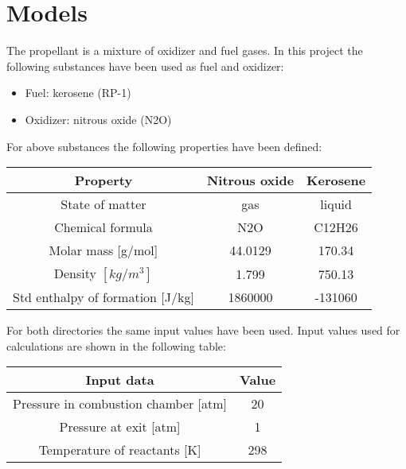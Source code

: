 \documentclass[11pt]{article}
\begin{document}
\section{Models}
The propellant is a mixture of oxidizer and fuel gases. In this project the following substances have been used as fuel and oxidizer:\\
\begin{itemize}
\item Fuel: kerosene (RP-1)
\item Oxidizer: nitrous oxide (N2O)
\end{itemize}
For above substances the following properties have been defined:\\
\begin{center}
\begin{tabular}{|c|c|c|}
\hline 
Property & Nitrous oxide & Kerosene \\ 
\hline
State of matter & gas & liquid\\
\hline 
Chemical formula & N2O & C12H26 \\ 
\hline 
Molar mass [g/mol] & 44.0129 & 170.34 \\ 
\hline 
Density $[kg/m^3]$ & 1.799 & 750.13\\
\hline
Std enthalpy of formation [J/kg] & 1860000 & -131060 \\
\hline
\end{tabular} 
\end{center}
For both directories the same input values have been used. Input values used for calculations are shown in the following table:\\
\begin{center}
\begin{tabular}{|c|c|}
\hline 
Input data  & Value \\ 
\hline 
Pressure in combustion chamber [atm] & 20 \\ 
\hline 
 Pressure at exit [atm] & 1 \\ 
\hline 
Temperature of reactants [K] & 298 \\ 
\hline 
\end{tabular} 
\end{center}
\newpage
\end{document}
